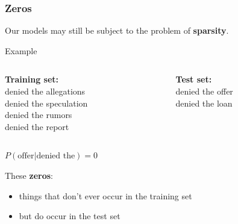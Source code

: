 \documentclass[13.5pt,aspecratio=169]{beamer}
\begin{document}
    
    \begin{frame}
            \frametitle{Zeros}
        \begin{alertblock}{}
            Our models may still be subject to the problem of \textbf{sparsity}.
        \end{alertblock}
            \pause
        \begin{exampleblock}{Example}
        \begin{columns}[t] %
            \begin{column}{0.45\textwidth} %
                \textbf{Training set:} \\
                denied the allegations \\
                    denied the speculation \\
                    denied the rumors \\
                    denied the report
            \end{column}
            \begin{column}{0.5\textwidth} %
                \textbf{Test set:} \\
                denied the offer \\
                    denied the loan
            \end{column}
        \end{columns}
        \centering $P(\text{offer} | \text{denied the}) = 0$
        \end{exampleblock}
            \pause
            \begin{block}{These \textbf{zeros}:}
                \begin{itemize}
                    \item things that don’t ever occur in the training set
                    \item but do occur in the test set
                \end{itemize}
        \end{block}
    \end{frame}
    
    
\end{document}
